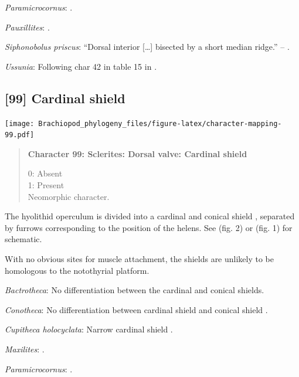 \documentclass[openany]{book}
\begin{document}
\hypertarget{Paramicrocornus-coding-98}{}
\emph{Paramicrocornus}: \citet{Zhang2018Ahyolithid}.

\hypertarget{Pauxillites-coding-98}{}
\emph{Pauxillites}: \citet{Marek1966}.

\hypertarget{Siphonobolus_priscus-coding-98}{}
\emph{Siphonobolus priscus}: ``Dorsal interior {[}\ldots{}{]} bisected
by a short median ridge.'' -- \citet{Popov2009Earlyontogeny}.

\hypertarget{Ussunia-coding-98}{}
\emph{Ussunia}: Following char 42 in table 15 in
\citet{Williams2000LinguliformeaCraniiformea}.

\subsection*{{[}99{]} Cardinal shield}\label{cardinal-shield}

\texttt{[image: Brachiopod\_phylogeny\_files/figure-latex/character-mapping-99.pdf]}

\begin{quote}
\textbf{Character 99: Sclerites: Dorsal valve: Cardinal shield}

0: Absent\\
1: Present\\
Neomorphic character.
\end{quote}

The hyolithid operculum is divided into a cardinal and conical shield
\citep{Zhang2018Ahyolithid}, separated by furrows corresponding to the
position of the helens. See \citet{Marek1976} (fig. 2) or
\citet{MartiMus2005} (fig. 1) for schematic.

With no obvious sites for muscle attachment, the shields are unlikely to
be homologous to the notothyrial platform.

\hypertarget{Bactrotheca-coding-99}{}
\emph{Bactrotheca}: No differentiation between the cardinal and conical
shields.

\hypertarget{Conotheca-coding-99}{}
\emph{Conotheca}: No differentiation between cardinal shield and conical
shield \citep{Wrona2003, Devaere2014}.

\hypertarget{Cupitheca_holocyclata-coding-99}{}
\emph{Cupitheca holocyclata}: Narrow cardinal shield
\citep{Skovsted2016}.

\hypertarget{Maxilites-coding-99}{}
\emph{Maxilites}: \citet{Marek1972}.

\hypertarget{Paramicrocornus-coding-99}{}
\emph{Paramicrocornus}: \citet{Zhang2018Ahyolithid}.
\end{document}
